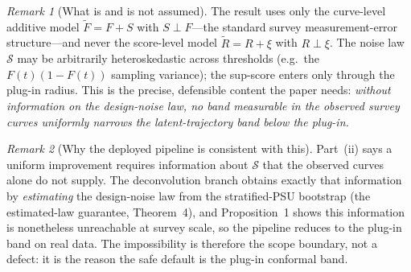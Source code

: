 \documentclass[12pt]{article}
\theoremstyle{definition}
\theoremstyle{remark}
\newtheorem{remark}{Remark}
\begin{document}
\begin{remark}[What is and is not assumed]
The result uses only the curve-level additive model $\widetilde F=F+S$ with $S\perp F$---the
standard survey measurement-error structure---and never the score-level model
$\widetilde R=R+\xi$ with $R\perp\xi$. The noise law $\mathcal S$ may be arbitrarily
heteroskedastic across thresholds (e.g.\ the $F(t)(1-F(t))$ sampling variance); the sup-score
enters only through the plug-in radius. This is the precise, defensible content the paper
needs: \emph{without information on the design-noise law, no band measurable in the observed
survey curves uniformly narrows the latent-trajectory band below the plug-in.}
\end{remark}

\begin{remark}[Why the deployed pipeline is consistent with this]
Part~(ii) says a uniform improvement requires information about $\mathcal S$ that the observed
curves alone do not supply. The deconvolution branch obtains exactly that information by
\emph{estimating} the design-noise law from the stratified-PSU bootstrap (the estimated-law
guarantee, Theorem~4), and Proposition~1 shows this information is nonetheless unreachable at
survey scale, so the pipeline reduces to the plug-in band on real data. The impossibility is
therefore the scope boundary, not a defect: it is the reason the safe default is the plug-in
conformal band.
\end{remark}
\end{document}
